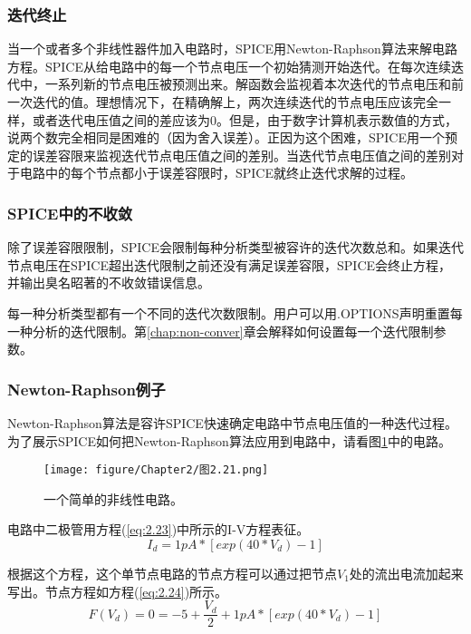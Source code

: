 \subsubsection{迭代终止}
当一个或者多个非线性器件加入电路时，SPICE用Newton-Raphson算法来解电路方程。SPICE从给电路中的每一个节点电压一个初始猜测开始迭代。在每次连续迭代中，一系列新的节点电压被预测出来。解函数会监视着本次迭代的节点电压和前一次迭代的值。理想情况下，在精确解上，两次连续迭代的节点电压应该完全一样，或者迭代电压值之间的差应该为0。但是，由于数字计算机表示数值的方式，说两个数完全相同是困难的（因为舍入误差）。正因为这个困难，SPICE用一个预定的误差容限来监视迭代节点电压值之间的差别。当迭代节点电压值之间的差别对于电路中的每个节点都小于误差容限时，SPICE就终止迭代求解的过程。

\subsubsection{SPICE中的不收敛}
除了误差容限限制，SPICE会限制每种分析类型被容许的迭代次数总和。如果迭代节点电压在SPICE超出迭代限制之前还没有满足误差容限，SPICE会终止方程，并输出臭名昭著的不收敛错误信息。

每一种分析类型都有一个不同的迭代次数限制。用户可以用.OPTIONS声明重置每一种分析的迭代限制。第\ref{chap:non-conver}章会解释如何设置每一个迭代限制参数。

\subsubsection{Newton-Raphson例子}
Newton-Raphson算法是容许SPICE快速确定电路中节点电压值的一种迭代过程。为了展示SPICE如何把Newton-Raphson算法应用到电路中，请看图\ref{图2.21}中的电路。
\begin{figure}[htbp]
\small
    \centering
    \texttt{[image: figure/Chapter2/图2.21.png]}
    \caption{一个简单的非线性电路。}
    \label{图2.21}
\end{figure}

电路中二极管用方程(\ref{eq:2.23})中所示的I-V方程表征。
\begin{equation}
    I_d = 1pA * [exp(40 * V_d)-1]
    \label{eq:2.23}
\end{equation}

根据这个方程，这个单节点电路的节点方程可以通过把节点$V_1$处的流出电流加起来写出。节点方程如方程(\ref{eq:2.24})所示。
\begin{equation}
    F(V_d) = 0 = -5 + \frac{V_d}{2} + 1pA * [exp(40 * V_d)-1]
    \label{eq:2.24}
\end{equation}

